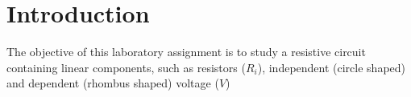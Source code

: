 \section{Introduction}
\label{sec:introduction}

The objective of this laboratory assignment is to study a resistive circuit containing linear components, such as resistors ($R_i$), independent (circle shaped) and dependent (rhombus shaped) voltage ($V$) 
